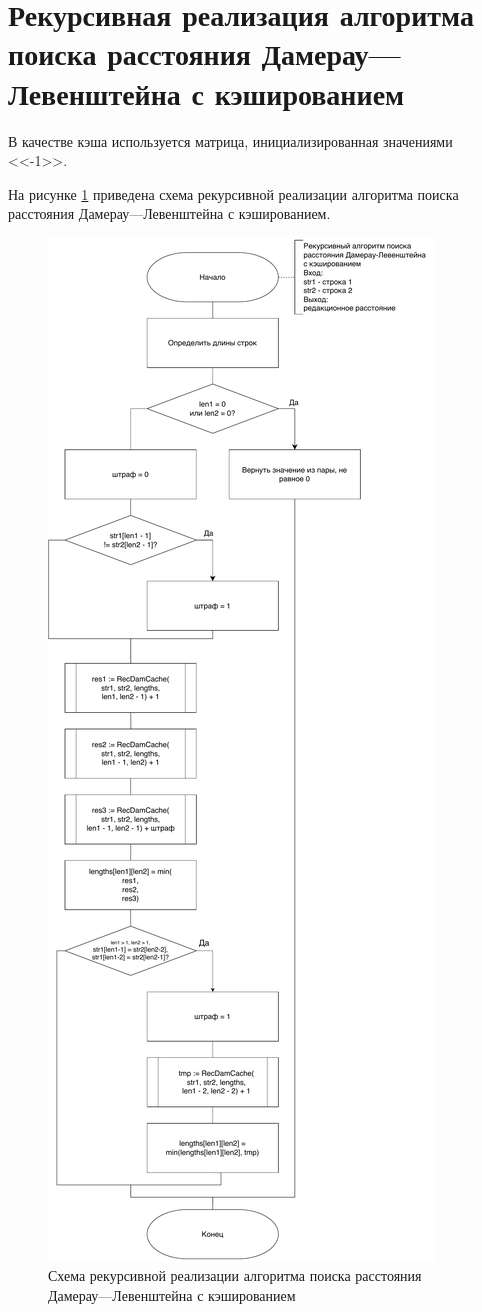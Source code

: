 \section{Рекурсивная реализация алгоритма поиска расстояния Дамерау---Левенштейна с кэшированием}

В качестве кэша используется матрица, инициализированная значениями <<-1>>. 

На рисунке \ref{pic:cache-dam-lev} приведена схема рекурсивной реализации алгоритма поиска расстояния Дамерау---Левенштейна с кэшированием.

\begin{figure}[H]
	\centering
	\includegraphics[scale=0.35]{assets/dam-lev-cache.pdf}
	\caption{Схема рекурсивной реализации алгоритма поиска расстояния Дамерау---Левенштейна с кэшированием}
	\label{pic:cache-dam-lev}
\end{figure}
